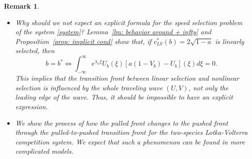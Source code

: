 \documentclass[11pt,a4paper]{article}
\newtheorem{remark}[theorem]{\textbf{Remark}}
\numberwithin{equation}{section}
\numberwithin{figure}{section}
\newcommand{\red}[1]{{\color{red}#1}}
\begin{document}
\begin{remark}
\begin{itemize}
\item[(2)] Why should we not expect an explicit formula for the speed selection problem of the
system \eqref{system}?
 Lemma~\ref{lm: behavior around + infty} and Proposition~\ref{prop: implicit cond} show that, if $c^*_{LV}(b)=2\sqrt{1-a}$ is linearly selected, then 
$$b=b^*\Longleftrightarrow \int_{-\infty}^{\infty} e^{\lambda_u\xi} U_b(\xi)[a(1-V_b)-U_b](\xi)d\xi=0.$$
This implies that the transition front between linear selection and nonlinear selection is influenced
by the whole traveling wave $(U,V)$, not only the leading edge of the wave. Thus, it should be impossible to have an explicit expression.
\item[(3)] We show the process of how the pulled front changes to the pushed front through the pulled-to-pushed transition front for the two-species Lotka-Volterra competition system.
We expect that such a phenomenon can be found in more complicated models.
\end{itemize}
\end{remark}






\end{document}
